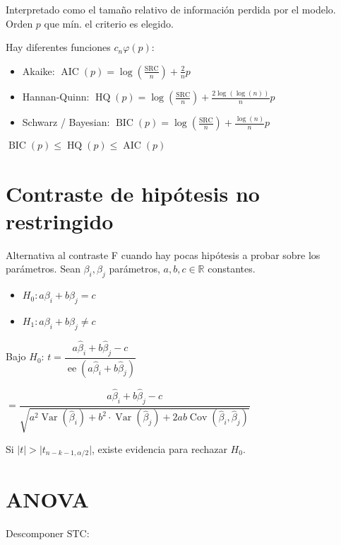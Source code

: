 \documentclass[10pt, a4paper, landscape]{article}
\DeclareMathOperator{\Var}{Var}
\DeclareMathOperator{\se}{ee}
\DeclareMathOperator{\Cov}{Cov}
\DeclareMathOperator{\AIC}{AIC}
\DeclareMathOperator{\HQ}{HQ}
\DeclareMathOperator{\BIC}{BIC}
\newcommand{\SSR}{\text{SRC}}
\newcommand{\SST}{\text{STC}}
\begin{document}
\begin{multicols}{3}
Interpretado como el tamaño relativo de información perdida por el modelo. Orden \( p \) que mín. el criterio es elegido.

Hay diferentes funciones \( c_{n} \varphi(p) \):

\begin{itemize}[leftmargin=*]
	\item Akaike: \( \AIC(p) = \log(\frac{\SSR}{n}) + \frac{2}{n} p \)
	\item Hannan-Quinn: \( \HQ(p) = \log(\frac{\SSR}{n}) + \frac{2 \log(\log(n))}{n} p \)
	\item Schwarz / Bayesian: \( \BIC(p) = \log(\frac{\SSR}{n}) + \frac{\log(n)}{n} p \)
\end{itemize}

\( \BIC(p) \leq \HQ(p) \leq \AIC(p) \)

\section*{Contraste de hipótesis no restringido}

Alternativa al contraste F cuando hay pocas hipótesis a probar sobre los parámetros. Sean \( \beta_{i}, \beta_{j} \) parámetros, \( a, b, c \in \mathbb{R} \) constantes.

\begin{itemize}[leftmargin=*]
	\item \( H_{0}: a \beta_{i} + b \beta_{j} = c \)
	\item \( H_{1}: a \beta_{i} + b \beta_{j} \neq c \)
\end{itemize}

\begin{center}
	Bajo \( H_{0} \): \quad
	\( t = \dfrac{a \hat{\beta}_{i} + b \hat{\beta}_{j} - c}{\se(a \hat{\beta}_{i} + b \hat{\beta}_{j})} \)

	\( = \dfrac{a \hat{\beta}_{i} + b \hat{\beta}_{j} - c}{\sqrt{a^{2} \Var(\hat{\beta}_{i}) + b^{2} \cdot \Var(\hat{\beta}_{j}) + 2 a b \Cov(\hat{\beta}_{i}, \hat{\beta}_{j})}} \)
\end{center}

Si \( \lvert t \rvert > \lvert t_{n - k - 1, \alpha / 2}\rvert \), existe evidencia para rechazar \( H_{0} \).

\section*{ANOVA}

Descomponer \( \SST \):


\end{multicols}
\end{document}
